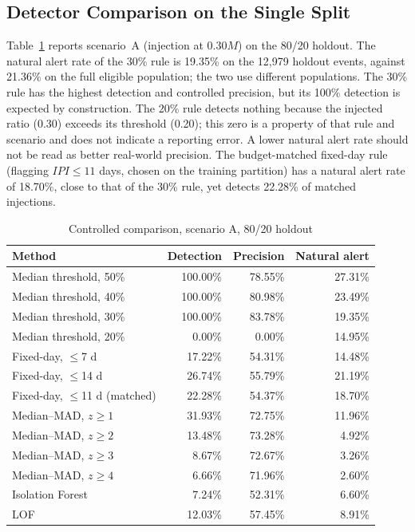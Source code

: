 \documentclass[conference]{IEEEtran}
\begin{document}
\subsection{Detector Comparison on the Single Split}
Table~\ref{tab:detectors} reports scenario~A (injection at $0.30M$) on the 80/20 holdout. The natural alert rate of the 30\% rule is 19.35\% on the 12,979 holdout events, against 21.36\% on the full eligible population; the two use different populations. The 30\% rule has the highest detection and controlled precision, but its 100\% detection is expected by construction. The 20\% rule detects nothing because the injected ratio (0.30) exceeds its threshold (0.20); this zero is a property of that rule and scenario and does not indicate a reporting error. A lower natural alert rate should not be read as better real-world precision. The budget-matched fixed-day rule (flagging $IPI\leq11$ days, chosen on the training partition) has a natural alert rate of 18.70\%, close to that of the 30\% rule, yet detects 22.28\% of matched injections.

\begin{table}[t]
\caption{Controlled comparison, scenario A, 80/20 holdout}
\label{tab:detectors}
\centering
\footnotesize
\begin{tabular}{lrrr}
\toprule
\textbf{Method} & \textbf{Detection} & \textbf{Precision} & \textbf{Natural alert}\\
\midrule
Median threshold, 50\% & 100.00\% & 78.55\% & 27.31\%\\
Median threshold, 40\% & 100.00\% & 80.98\% & 23.49\%\\
Median threshold, 30\% & 100.00\% & 83.78\% & 19.35\%\\
Median threshold, 20\% & 0.00\% & 0.00\% & 14.95\%\\
Fixed-day, $\leq$7 d & 17.22\% & 54.31\% & 14.48\%\\
Fixed-day, $\leq$14 d & 26.74\% & 55.79\% & 21.19\%\\
Fixed-day, $\leq$11 d (matched) & 22.28\% & 54.37\% & 18.70\%\\
Median--MAD, $z\geq1$ & 31.93\% & 72.75\% & 11.96\%\\
Median--MAD, $z\geq2$ & 13.48\% & 73.28\% & 4.92\%\\
Median--MAD, $z\geq3$ & 8.67\% & 72.67\% & 3.26\%\\
Median--MAD, $z\geq4$ & 6.66\% & 71.96\% & 2.60\%\\
Isolation Forest & 7.24\% & 52.31\% & 6.60\%\\
LOF & 12.03\% & 57.45\% & 8.91\%\\
\bottomrule
\end{tabular}
\end{table}
\end{document}
